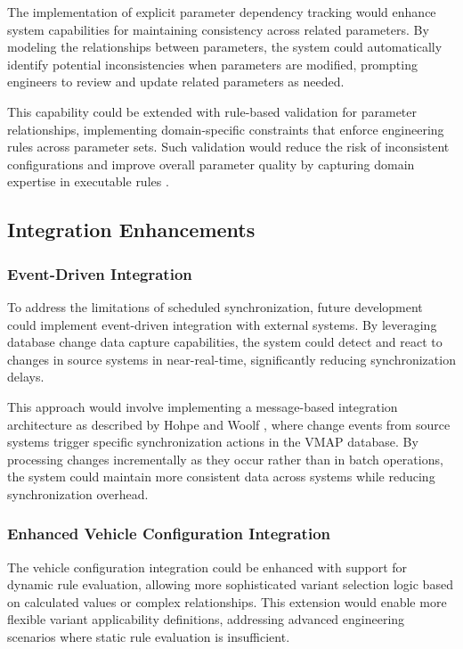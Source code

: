 The implementation of explicit parameter dependency tracking would enhance system capabilities for maintaining consistency across related parameters. By modeling the relationships between parameters, the system could automatically identify potential inconsistencies when parameters are modified, prompting engineers to review and update related parameters as needed.

This capability could be extended with rule-based validation for parameter relationships, implementing domain-specific constraints that enforce engineering rules across parameter sets. Such validation would reduce the risk of inconsistent configurations and improve overall parameter quality by capturing domain expertise in executable rules \cite{pretschner2007software}.

\subsection{Integration Enhancements}
\label{subsec:integration-enhancements}

\subsubsection{Event-Driven Integration}
\label{subsubsec:event-driven-integration}

To address the limitations of scheduled synchronization, future development could implement event-driven integration with external systems. By leveraging database change data capture capabilities, the system could detect and react to changes in source systems in near-real-time, significantly reducing synchronization delays.

This approach would involve implementing a message-based integration architecture as described by Hohpe and Woolf \cite{hohpe2002enterprise}, where change events from source systems trigger specific synchronization actions in the VMAP database. By processing changes incrementally as they occur rather than in batch operations, the system could maintain more consistent data across systems while reducing synchronization overhead.

\subsubsection{Enhanced Vehicle Configuration Integration}
\label{subsubsec:vehicle-configuration-integration}

The vehicle configuration integration could be enhanced with support for dynamic rule evaluation, allowing more sophisticated variant selection logic based on calculated values or complex relationships. This extension would enable more flexible variant applicability definitions, addressing advanced engineering scenarios where static rule evaluation is insufficient.

